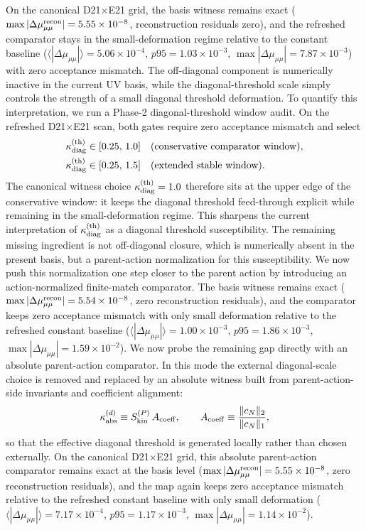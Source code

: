 \documentclass[aps,prd,onecolumn,notitlepage,nofootinbib,superscriptaddress,11pt,floatfix]{revtex4-2}
\begin{document}
On the canonical D21$\times$E21 grid, the basis witness remains exact ($\max|\Delta \mu_{\mu\mu}^{\rm recon}|=5.55\times10^{-8}$, reconstruction residuals zero), and the refreshed comparator stays in the small-deformation regime relative to the constant baseline ($\langle|\Delta\mu_{\mu\mu}|\rangle=5.06\times10^{-4}$, $p95=1.03\times10^{-3}$, $\max|\Delta\mu_{\mu\mu}|=7.87\times10^{-3}$) with zero acceptance mismatch. The off-diagonal component is numerically inactive in the current UV basis, while the diagonal-threshold scale simply controls the strength of a small diagonal threshold deformation.
To quantify this interpretation, we run a Phase-2 diagonal-threshold window audit. On the refreshed D21$\times$E21 scan, both gates require zero acceptance mismatch and select
\[
\begin{aligned}
\kappa_{\rm diag}^{\rm(th)}&\in[0.25,\,1.0]
&&\text{(conservative comparator window)},\\
\kappa_{\rm diag}^{\rm(th)}&\in[0.25,\,1.5]
&&\text{(extended stable window)}.
\end{aligned}
\]
The canonical witness choice $\kappa_{\rm diag}^{\rm(th)}=1.0$ therefore sits at the upper edge of the conservative window: it keeps the diagonal threshold feed-through explicit while remaining in the small-deformation regime. This sharpens the current interpretation of $\kappa_{\rm diag}^{\rm(th)}$ as a diagonal threshold susceptibility. The remaining missing ingredient is not off-diagonal closure, which is numerically absent in the present basis, but a parent-action normalization for this susceptibility.
We now push this normalization one step closer to the parent action by introducing an action-normalized finite-match comparator. The basis witness remains exact ($\max|\Delta \mu_{\mu\mu}^{\rm recon}|=5.54\times10^{-8}$, zero reconstruction residuals), and the comparator keeps zero acceptance mismatch with only small deformation relative to the refreshed constant baseline ($\langle|\Delta\mu_{\mu\mu}|\rangle=1.00\times10^{-3}$, $p95=1.86\times10^{-3}$, $\max|\Delta\mu_{\mu\mu}|=1.59\times10^{-2}$).
We now probe the remaining gap directly with an absolute parent-action comparator. In this mode the external diagonal-scale choice is removed and replaced by an absolute witness built from parent-action-side invariants and coefficient alignment:
\[
\kappa_{\rm abs}^{(d)}\equiv S_{\rm kin}^{(P)}\,A_{\rm coeff},
\qquad
A_{\rm coeff}\equiv \frac{\|c_N\|_2}{\|c_N\|_1},
\]
so that the effective diagonal threshold is generated locally rather than chosen externally. On the canonical D21$\times$E21 grid, this absolute parent-action comparator remains exact at the basis level ($\max|\Delta \mu_{\mu\mu}^{\rm recon}|=5.55\times10^{-8}$, zero reconstruction residuals), and the map again keeps zero acceptance mismatch relative to the refreshed constant baseline with only small deformation ($\langle|\Delta\mu_{\mu\mu}|\rangle=7.17\times10^{-4}$, $p95=1.17\times10^{-3}$, $\max|\Delta\mu_{\mu\mu}|=1.14\times10^{-2}$).
\end{document}
